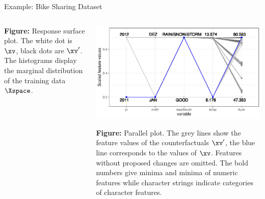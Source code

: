 \documentclass[11pt,compress,t,notes=noshow, xcolor=table]{beamer}
\begin{document}
\begin{vbframe}{Example: Bike Sharing Dataset}
\begin{columns}
\begin{column}{0.5\textwidth}
			\scriptsize{\textbf{Figure:} Response surface plot. 
				The white dot is $\xv$, black dots are $\xv'$. The histograms display the marginal distribution of the training data $\Xspace$.} 
				
		\end{column}
		\begin{column}{0.5\textwidth}  
			\begin{center}
				\includegraphics[width=1\textwidth]{figure/counterfactuals_bike_para}
			\end{center}
		
		\scriptsize{\textbf{Figure:} Parallel plot. 
			The grey lines show the feature values of the counterfactuals $\xv'$, the blue line corresponds to the values of $\xv$. Features without proposed changes are omitted. The bold numbers give minima and minima of numeric features while character strings indicate categories of character features.} 
		
		\end{column}
	\end{columns}
\end{vbframe}
\end{document}

